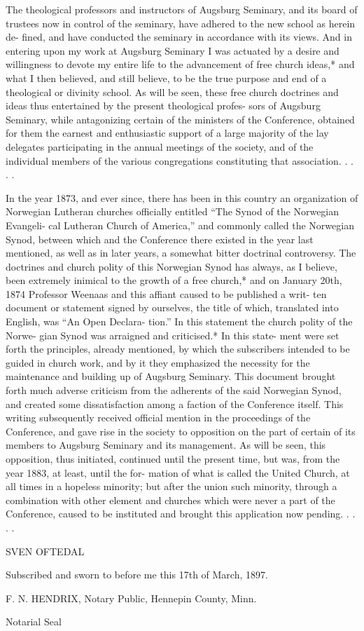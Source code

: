 The theological professors and instructors of Augsburg
Seminary, and its board of trustees now in control of the
seminary, have adhered to the new school as herein de-
fined, and have conducted the seminary in accordance with
its views. And in entering upon my work at Augsburg
Seminary I was actuated by a desire and willingness to
devote my entire life to the advancement of free church
ideas,* and what I then believed, and still believe, to be
the true purpose and end of a theological or divinity
school. As will be seen, these free church doctrines and
ideas thus entertained by the present theological profes-
sors of Augsburg Seminary, while antagonizing certain of
the ministers of the Conference, obtained for them the
earnest and enthusiastic support of a large majority of the
lay delegates participating in the annual meetings of the
society, and of the individual members of the various
congregations constituting that association. . . . .

In the year 1873, and ever since, there has been in this
country an organization of Norwegian Lutheran churches
officially entitled “The Synod of the Norwegian Evangeli-
cal Lutheran Church of America,” and commonly called
the Norwegian Synod, between which and the Conference
there existed in the year last mentioned, as well as in later
years, a somewhat bitter doctrinal controversy. The
doctrines and church polity of this Norwegian Synod has
always, as I believe, been extremely inimical to the growth
of a free church,* and on January 20th, 1874 Professor
Weenaas and this affiant caused to be published a writ-
ten document or statement signed by ourselves, the title
of which, translated into English, was “An Open Declara-
tion.” In this statement the church polity of the Norwe-
gian Synod was arraigned and criticised.* In this state-
ment were set forth the principles, already mentioned, by
which the subscribers intended to be guided in church
work, and by it they emphasized the necessity for the
maintenance and building up of Augsburg Seminary. This
document brought forth much adverse criticism from the
adherents of the said Norwegian Synod, and created some
dissatisfaction among a faction of the Conference itself.
This writing subsequently received official mention in the
proceedings of the Conference, and gave rise in the society
to opposition on the part of certain of its members to
Augsburg Seminary and its management. As will be seen,
this opposition, thus initiated, continued until the present
time, but was, from the year 1883, at least, until the for-
mation of what is called the United Church, at all times
in a hopeless minority; but after the union such minority,
through a combination with other element and churches
which were never a part of the Conference, caused to be
instituted and brought this application now pending. . . . .

SVEN OFTEDAL

Subscribed and sworn to before me this 17th of March,
1897.

F. N. HENDRIX,
Notary Public, Hennepin County, Minn.

Notarial Seal